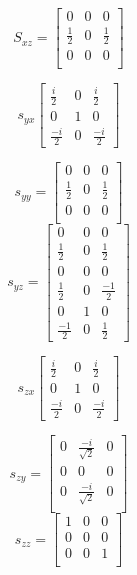 \documentclass[12pt]{article}
\begin{document}
\begin{equation}
S_{xz} = 
\begin{bmatrix}
0           & 0 & 0\\
\frac{1}{2} & 0  & \frac{1}{2} \\ 
0           & 0 & 0\\
\end{bmatrix}
\end{equation}


\begin{equation}
s_{yx}
\begin{bmatrix}
\frac{i}{2} & 0  & \frac{i}{2} \\ 
0           & 1 & 0\\
\frac{-i}{2} & 0  & \frac{-i}{2} 
\end{bmatrix}
\end{equation}

\begin{equation}
s_{yy} = 
\begin{bmatrix}
0           & 0 & 0\\
\frac{1}{2} & 0  & \frac{1}{2} \\ 
0           & 0 & 0\\
\end{bmatrix}
\end{equation}
\begin{equation}
s_{yz} = 
\begin{bmatrix}
0           & 0 & 0\\
\frac{1}{2} & 0  & \frac{1}{2} \\ 
0           & 0 & 0\\


\frac{1}{2}  & 0  & \frac{-1}{2} \\ 
0            & 1  & 0\\
\frac{-1}{2} & 0  & \frac{1}{2} 
\end{bmatrix}
\end{equation}

\begin{equation}
s_{zx}
\begin{bmatrix}
\frac{i}{2} & 0  & \frac{i}{2} \\ 
0           & 1 & 0\\
\frac{-i}{2} & 0  & \frac{-i}{2} 
\end{bmatrix}
\end{equation}

\begin{equation}
s_{zy} = 
\begin{bmatrix}
0     &  \frac{-i}{\sqrt{2}} & 0 \\ 
0     & 0                    & 0 \\
0     &  \frac{-i}{\sqrt{2}} & 0 \\
\end{bmatrix}
\end{equation}
\begin{equation}
s_{zz} = 
\begin{bmatrix}
1     & 0 & 0\\
0     & 0 & 0 \\ 
0     & 0 & 1\\
\end{bmatrix}
\end{equation}
\end{document}

